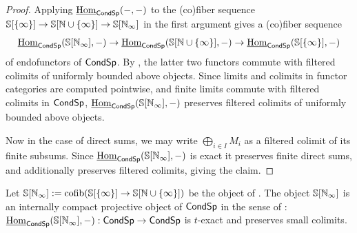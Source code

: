 \begin{proof}
    Applying $\underline{\mathrm{Hom}}_{\mathsf{Cond}\mathsf{Sp}}(-,-)$ to the (co)fiber sequence $\mathbb{S}[\{\infty\}]\to\mathbb{S}[\mathbb{N}\cup\{\infty\}]\to\mathbb{S}[\mathbb{N}_{\infty}]$ in the first argument gives a (co)fiber sequence 
    $$\underline{\mathrm{Hom}}_{\mathsf{Cond}\mathsf{Sp}}(\mathbb{S}[\mathbb{N}_{\infty}],-)\to\underline{\mathrm{Hom}}_{\mathsf{Cond}\mathsf{Sp}}(\mathbb{S}[\mathbb{N}\cup\{\infty\}],-)\to\underline{\mathrm{Hom}}_{\mathsf{Cond}\mathsf{Sp}}(\mathbb{S}[\{\infty\}],-)$$
    of endofunctors of $\mathsf{Cond}\mathsf{Sp}$. By \cite[Lem. 2.7.1]{BrinkCondensed}, the latter two functors commute with filtered colimits of uniformly bounded above objects. Since limits and colimits in functor categories are computed pointwise, and finite limits commute with filtered colimits in $\mathsf{Cond}\mathsf{Sp}$, $\underline{\mathrm{Hom}}_{\mathsf{Cond}\mathsf{Sp}}(\mathbb{S}[\mathbb{N}_{\infty}],-)$ preserves filtered colimits of uniformly bounded above objects. 

    Now in the case of direct sums, we may write $\bigoplus_{i\in I}M_{i}$ as a filtered colimit of its finite subsums. Since $\underline{\mathrm{Hom}}_{\mathsf{Cond}\mathsf{Sp}}(\mathbb{S}[\mathbb{N}_{\infty}],-)$ is exact it preserves finite direct sums, and additionally preserves filtered colimits, giving the claim. 
\end{proof}
\begin{proposition}\label{prop: nullsequence quotient is internally compact projective}
    Let $\mathbb{S}[\mathbb{N}_{\infty}]:=\mathrm{cofib}(\mathbb{S}[\{\infty\}]\to\mathbb{S}[\mathbb{N}\cup\{\infty\}])$ be the object of . The object $\mathbb{S}[\mathbb{N}_{\infty}]$ is an internally compact projective object of $\mathsf{Cond}\mathsf{Sp}$ in the sense of : $\underline{\mathrm{Hom}}_{\mathsf{Cond}\mathsf{Sp}}(\mathbb{S}[\mathbb{N}_{\infty}],-):\mathsf{Cond}\mathsf{Sp}\to\mathsf{Cond}\mathsf{Sp}$ is $t$-exact and preserves small colimits. 
\end{proposition}
